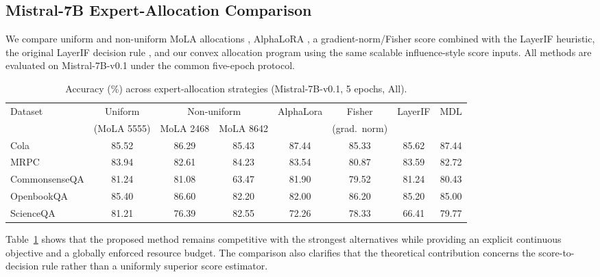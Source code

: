 \documentclass[accepted]{uai2026}%
\theoremstyle{remark}%
\begin{document}
\subsection{Mistral-7B Expert-Allocation Comparison}
We compare uniform and non-uniform MoLA allocations
\citep{MolA}, AlphaLoRA \citep{alphalora}, a gradient-norm/Fisher score
combined with the LayerIF heuristic, the original LayerIF decision rule
\citep{layerIF}, and our convex allocation program using the same scalable
influence-style score inputs. All methods are evaluated on Mistral-7B-v0.1
under the common five-epoch protocol.

\begin{table}[tbh]
  \centering
  \caption{Accuracy (\%) across expert-allocation strategies (Mistral-7B-v0.1, 5 epochs, All).}
  \label{tab:comparison}
  \begin{tabular}{lccccccc}
    \toprule
    Dataset & Uniform & \multicolumn{2}{c}{Non-uniform} & AlphaLora & Fisher & LayerIF & MDL \\
     & (MoLA 5555) & MoLA 2468 & MoLA 8642 & & (grad.\ norm) & & \\
    \midrule
    Cola         & 85.52 & 86.29 & 85.43 & 87.44 & 85.33 & 85.62 & 87.44 \\
    MRPC         & 83.94 & 82.61 & 84.23 & 83.54 & 80.87 & 83.59 & 82.72 \\
    CommonsenseQA        & 81.24 & 81.08 & 63.47 & 81.90 & 79.52 & 81.24 & 80.43 \\
    OpenbookQA       & 85.40 & 86.60 & 82.20 & 82.00 & 86.20 & 85.20 & 85.00 \\
    ScienceQA & 81.21 & 76.39 & 82.55 & 72.26 & 78.33 & 66.41 & 79.77 \\
    \bottomrule
  \end{tabular}
\end{table}
Table~\ref{tab:comparison} shows that the proposed method remains
competitive with the strongest alternatives while providing an explicit
continuous objective and a globally enforced resource budget. The comparison
also clarifies that the theoretical contribution concerns the score-to-decision
rule rather than a uniformly superior score estimator.
\end{document}
